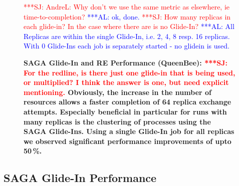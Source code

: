 \documentclass{rspublic}
\newcommand{\alnote}[1]{ {\textcolor{blue} { ***AL: #1 }}}
\newcommand{\jhanote}[1]{ {\textcolor{red} { ***SJ: #1 }}}
\newcommand{\alnote}[1]{}
\newcommand{\jhanote}[1]{}
\begin{document}
\begin{figure}[th]
  \centering
  \caption{\footnotesize \bf SAGA Glide-In and RE Performance
    (QueenBee): \jhanote{For the redline, is there just one glide-in
      that is being used, or multiplied? I think the answer is one, but
      need explicit mentioning.}  Obviously, the increase in the
    number of resources allows a faster completion of 64 replica exchange
    attempts. Especially beneficial in particular for runs with many
    replicas is the clustering of processes using the SAGA
    Glide-Ins. Using a single Glide-In job for all replicas we
    observed significant performance improvements of upto 50\,\%.}
  \jhanote{AndreL: Why don't we use the same metric as elsewhere, ie
    time-to-completion?}\alnote{ok, done.}
  \jhanote{How many replicas in each glide-in? In the case where there
    are is no Glide-In?}  \alnote{All Replicas are within the single
    Glide-In, i.e. 2, 4, 8 resp. 16 replicas.  With 0 Glide-Ins each
    job is separately started - no glidein is used.}
    \label{fig:perf_remd_glidin}
\end{figure} 

\subsection{SAGA Glide-In Performance}
\end{document}
